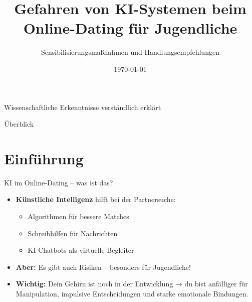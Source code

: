 \documentclass[10pt,aspectratio=169]{beamer}
\title{Gefahren von KI-Systemen beim Online-Dating für Jugendliche}
\subtitle{Sensibilisierungsmaßnahmen und Handlungsempfehlungen}
\author{}
\institute{Für Jugendliche – von Expert:innen}
\date{\today}
\begin{document}
	
	\begin{frame}
		\titlepage
		\begin{center}
			\small Wissenschaftliche Erkenntnisse verständlich erklärt
		\end{center}
	\end{frame}
	
	\begin{frame}{Überblick}
		\tableofcontents
	\end{frame}
	
	\section{Einführung}
	\begin{frame}{KI im Online-Dating – was ist das?}
		\begin{itemize}
			\item \textbf{Künstliche Intelligenz} hilft bei der Partnersuche:
			\begin{itemize}
				\item Algorithmen für bessere Matches
				\item Schreibhilfen für Nachrichten
				\item KI-Chatbots als virtuelle Begleiter
			\end{itemize}
			\item \textbf{Aber:} Es gibt auch Risiken – besonders für Jugendliche!
			\item \textbf{Wichtig:} Dein Gehirn ist noch in der Entwicklung → du bist anfälliger für Manipulation, impulsive Entscheidungen und starke emotionale Bindungen.\cite{Stanford2025}
		\end{itemize}
	\end{frame}
	
\end{document}
